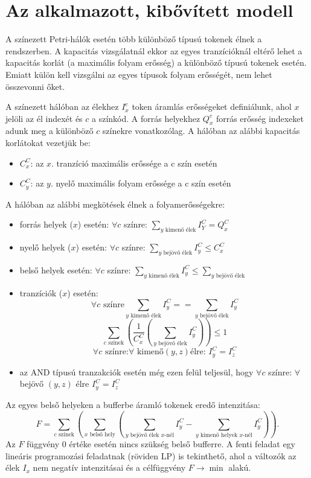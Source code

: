 \section{Az alkalmazott, kibővített modell}

A színezett Petri-hálók esetén több különböző típusú tokenek élnek a rendszerben. A kapacitás vizsgálatnál ekkor az egyes tranzícióknál eltérő lehet a kapacitás korlát (a maximális folyam erősség) a különböző típusú tokenek esetén. Emiatt külön kell vizsgálni az egyes típusok folyam erősségét, nem lehet összevonni őket.

A színezett hálóban az élekhez $I^c_x$ token áramlás erősségeket definiálunk, ahol $x$ jelöli az él indexét és $c$ a színkód. A forrás helyekhez $Q^c_x$ forrás erősség indexeket adunk meg a különböző $c$ színekre vonatkozólag. A hálóban az alábbi kapacitás korlátokat vezetjük be:
\begin{itemize}
\item $C^C_x$: az $x$. tranzíció maximális erőssége a c szín esetén 
\item $C^C_y$: az $y$. nyelő maximális folyam erőssége a c szín esetén
\end{itemize}
A hálóban az alábbi megkötések élnek a folyamerősségekre:
\begin{itemize}
\item forrás helyek ($x$) esetén: $\forall c$ színre: $\sum_{y\text{ kimenő élek}}I^C_Y = Q^C_x$
\item nyelő helyek ($x$) esetén: $\forall c$ színre: $\sum_{y\text{ bejövő élek}}I^C_y \leq C^C_x$
\item belső helyek esetén: $\forall c$ színre: $\sum_{y\text{ kimenő élek}} I^C_y \leq \sum_{y\text{ bejövő élek}}$
\item tranzíciók ($x$) esetén:
$$\forall c \text{ színre} \sum_{y\text{ kimenő élek}} I^C_y == \sum_{y\text{ bejövő élek}} I^C_y $$
$$\sum_{c \text{ színek}}\left( \frac{1}{C^C_x} \left( \sum_{y \text{ bejövő élek}} I^C_y \right) \right) \leq 1$$
$$\forall c \text{ színre:} \forall \text{ kimenő} (y,z) \text{élre: } I^C_y=I^C_z$$
\item az AND típusú tranzakciók esetén még ezen felül teljesül, hogy 	$\forall c$ színre: $\forall$ bejövő $(y,z)$ élre $I^C_y=I^C_z$
\end{itemize}
Az egyes belső helyeken a bufferbe áramló tokenek  eredő intenzitása:
$$F=\sum_{c\text{ színek}} \left( \sum_{x\text{ belső hely}}\left( \sum_{y\text{ bejövő élek }x\text{-nél}}I^C_y - \sum_{y \text{ kimenő helyek }x\text{-nél}} I^C_y \right) \right).$$
Az $F$ függvény 0 értéke esetén nincs szükség belső bufferre. 
A fenti feladat egy lineáris programozási feladatnak (röviden LP) is tekinthető, ahol a változók az élek $I_x$ nem negatív intenzitásai és a célfüggvény $F \rightarrow \min$ alakú. 

